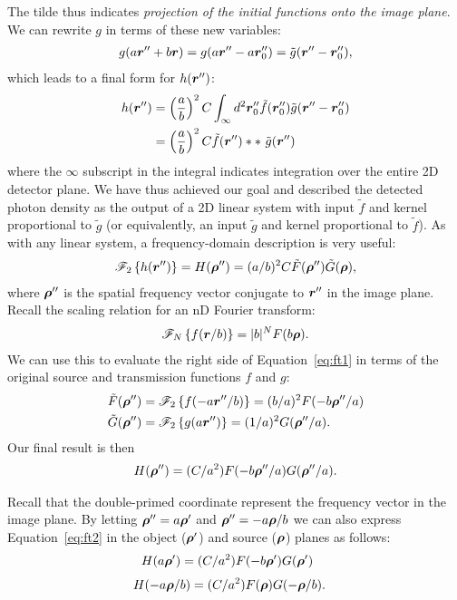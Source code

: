 \documentclass[mphy386-notes.tex]{subfiles}
\begin{document}
The tilde thus indicates \textit{projection of the initial functions onto the image plane}. We
can rewrite $g$ in terms of these new variables: 
\begin{align}
  g(a\boldsymbol{r}'' + b\boldsymbol{r}) = g(a\boldsymbol{r}''-a\boldsymbol{r}_0'') = \tilde{g}(\boldsymbol{r}'' - \boldsymbol{r}_0''),
\end{align}
which leads to a final form for $h(\boldsymbol{r}'')$:
\begin{align}
  h(\boldsymbol{r}'')&=\left(\frac{a}{b}\right)^2 C \int_{\infty} d^2\boldsymbol{r}_0'' \tilde{f}(\boldsymbol{r}_0'')\tilde{g}(\boldsymbol{r}'' - \boldsymbol{r}_0'')\nonumber\\
             &=\left(\frac{a}{b}\right)^2 C \tilde{f}(\boldsymbol{r}'') \ast \ast \text{ } \tilde{g}(\boldsymbol{r}'')
\end{align}
where the $\infty$ subscript in the integral indicates integration over the
entire 2D detector plane. We have thus achieved our goal and described the
detected photon density as the output of a 2D linear system with input
$\tilde{f}$ and kernel proportional to $\tilde{g}$ (or equivalently, an input
$\tilde{g}$ and kernel proportional to $\tilde{f}$). As with any linear system, a
frequency-domain description is very useful:
\begin{align}
  \mathscr{F}_2\left\{h(\boldsymbol{r}'')\right\} = H(\boldsymbol{\rho}'') = (a/b)^2 C \tilde{F}(\boldsymbol{\rho}'')\tilde{G}(\boldsymbol{\rho}),
  \label{eq:ft1}
\end{align}
where $\boldsymbol{\rho}''$ is the spatial frequency vector conjugate to $\boldsymbol{r}''$ in the image plane.
Recall the scaling relation for an nD Fourier transform:
\begin{align}
  \mathscr{F}_N\left\{f(\boldsymbol{r}/b)\right\} = |b|^N F(b\boldsymbol{\rho}).
\end{align}
We can use this to evaluate the right side of Equation~\ref{eq:ft1} in terms of the
original source and transmission functions $f$ and $g$:
\begin{align}
  \tilde{F}(\boldsymbol{\rho}'') &= \mathscr{F}_2\left\{f(-a\boldsymbol{r}''/b)\right\} = (b/a)^2 F(-b\boldsymbol{\rho}''/a)\\
  \tilde{G}(\boldsymbol{\rho}'') &= \mathscr{F}_2\left\{g(a\boldsymbol{r}'')\right\} = (1/a)^2 G(\boldsymbol{\rho}''/a).
\end{align}
Our final result is then
\begin{align}
  H(\boldsymbol{\rho}'') = (C/a^2)F(-b\boldsymbol{\rho}''/a)G(\boldsymbol{\rho}''/a).
  \label{eq:ft2}
\end{align}

Recall that the double-primed coordinate represent the frequency vector
in the image plane.  By letting $\boldsymbol{\rho}'' = a\boldsymbol{\rho}'$ and 
$\boldsymbol{\rho}'' = -a\boldsymbol{\rho}/b$ we can also express Equation~\ref{eq:ft2} in the
object ($\boldsymbol{\rho}'$) and source ($\boldsymbol{\rho}$) planes as follows:
\begin{align}
  H(a\boldsymbol{\rho}') &= (C/a^2)F(-b\boldsymbol{\rho}')G(\boldsymbol{\rho}')\
  \label{eq:ft3}
\end{align}
\begin{align}
  H(-a\boldsymbol{\rho}/b) &= (C/a^2)F(\boldsymbol{\rho})G(-\boldsymbol{\rho}/b).
  \label{eq:ft4}
\end{align}
\end{document}
